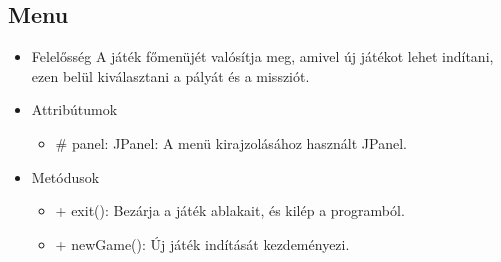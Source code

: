 \subsection{Menu}
\begin{itemize}
\item Felelősség\newline
A játék főmenüjét valósítja meg, amivel új játékot lehet indítani, ezen belül kiválasztani a pályát és a missziót.
\item Attribútumok\newline
	\begin{itemize}
		\item \# panel: JPanel: A menü kirajzolásához használt JPanel.
	\end{itemize}
\item Metódusok\newline
	\begin{itemize}
		\item + exit(): Bezárja a játék ablakait, és kilép a programból.
		\item + newGame(): Új játék indítását kezdeményezi.
	\end{itemize}
\end{itemize}

